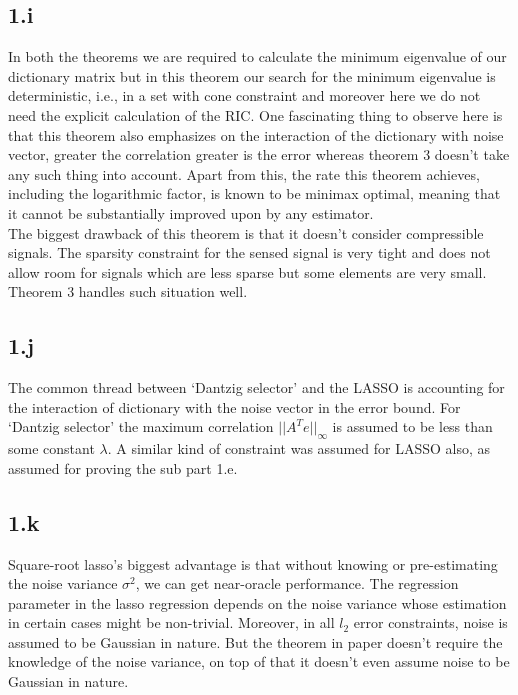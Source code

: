 \documentclass[12pt]{article}
\begin{document}
\subsection*{1.i}
In both the theorems we are required to calculate the minimum eigenvalue of our dictionary matrix but in this theorem our search for the minimum eigenvalue is deterministic, i.e.,   in a set with cone constraint and moreover here we do not need the explicit calculation of the RIC. One fascinating thing to observe here is that this theorem also emphasizes on the interaction of the dictionary with noise vector, greater the correlation greater is the error whereas theorem 3 doesn't take any such thing into account.  Apart from this, the rate this theorem achieves, including the logarithmic factor, is known to be minimax optimal, meaning that it cannot be substantially improved upon by any estimator.\\
The biggest drawback of this theorem is that it doesn't consider compressible signals. The sparsity constraint for the sensed signal is very tight and does not allow room for signals which are less sparse but some elements are very small. Theorem 3 handles such situation well. 
\subsection*{1.j}
The common thread between `Dantzig selector' and the LASSO is accounting for the interaction of dictionary with the noise vector in the error bound. For `Dantzig selector' the maximum correlation $||A^Te||_{\infty}$ is assumed to be less than some constant $\lambda$. A similar kind of constraint was assumed for LASSO also, as assumed for proving the sub part 1.e. 
\subsection*{1.k}
Square-root lasso's biggest advantage is that without knowing or pre-estimating the noise variance $\sigma^2$, we can get near-oracle performance. The regression parameter in the lasso regression depends on the noise variance whose estimation in certain cases might be non-trivial. Moreover, in all $l_2$ error constraints, noise is assumed to be Gaussian in nature. But the theorem in paper doesn't require the knowledge of the noise variance, on top of that it doesn't even assume noise to be Gaussian in nature.
\end{document}
